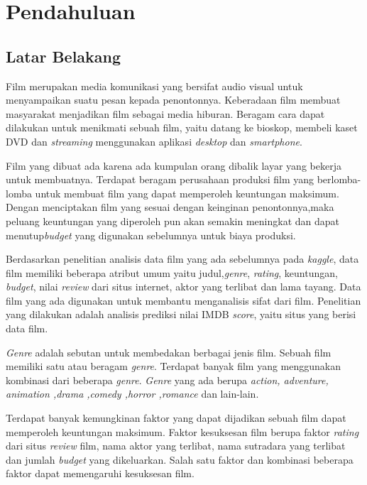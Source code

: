 \chapter{Pendahuluan}
\label{chap:intro}
   
\section{Latar Belakang}
\label{sec:label}

Film merupakan media komunikasi yang bersifat audio visual untuk menyampaikan suatu pesan kepada penontonnya. Keberadaan film membuat masyarakat menjadikan film sebagai media hiburan. Beragam cara dapat dilakukan untuk menikmati sebuah film, yaitu datang ke bioskop, membeli kaset DVD dan \textit{streaming} menggunakan aplikasi \textit{desktop} dan \textit{smartphone}.

Film yang dibuat ada karena ada kumpulan orang dibalik layar yang bekerja untuk membuatnya. Terdapat beragam perusahaan produksi film yang berlomba-lomba untuk membuat film yang dapat memperoleh keuntungan maksimum. Dengan menciptakan film yang sesuai dengan keinginan penontonnya,maka peluang keuntungan yang diperoleh pun akan semakin meningkat dan dapat menutup\textit{budget} yang digunakan sebelumnya untuk biaya produksi.
	
Berdasarkan penelitian analisis data film yang ada sebelumnya pada \textit{kaggle}, data film memiliki beberapa atribut umum yaitu judul,\textit{genre}, \textit{rating}, keuntungan,\textit{ budget}, nilai \textit{review} dari situs internet, aktor yang terlibat dan lama tayang. Data film yang ada digunakan untuk membantu menganalisis sifat dari film. Penelitian yang dilakukan adalah analisis prediksi nilai IMDB \textit{score}, yaitu situs yang berisi data film. 	
	

\textit{Genre} adalah sebutan untuk membedakan berbagai jenis film. Sebuah film memiliki satu atau beragam \textit{genre}. Terdapat banyak film yang menggunakan kombinasi dari beberapa \textit{genre}.  \textit{Genre} yang ada berupa \textit{action, adventure, animation ,drama ,comedy ,horror ,romance} dan lain-lain. 

Terdapat banyak kemungkinan faktor yang dapat dijadikan sebuah film dapat memperoleh keuntungan maksimum. Faktor kesuksesan film berupa faktor \textit{rating} dari situs \textit{review} film, nama aktor yang terlibat, nama sutradara yang terlibat dan jumlah \textit{budget} yang dikeluarkan. Salah satu faktor dan kombinasi beberapa faktor dapat memengaruhi kesuksesan film.
	
